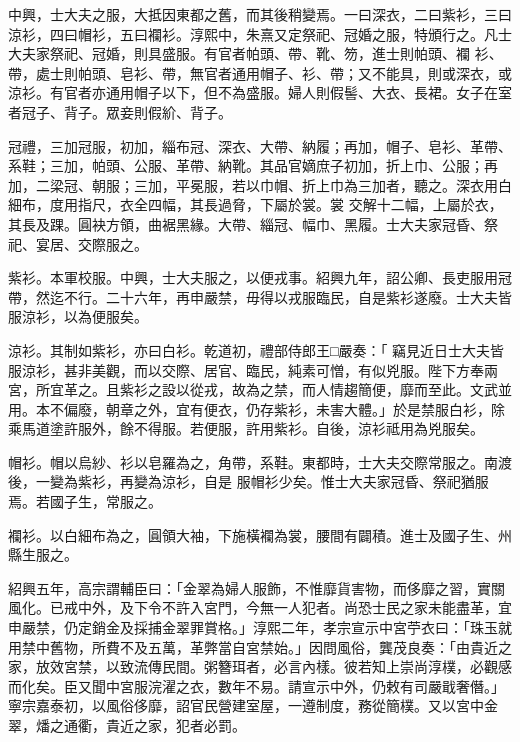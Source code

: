 \begin{pinyinscope}
 中興，士大夫之服，大抵因東都之舊，而其後稍變焉。一曰深衣，二曰紫衫，三曰涼衫，四曰帽衫，五曰襴衫。淳熙中，朱熹又定祭祀、冠婚之服，特頒行之。凡士大夫家祭祀、冠婚，則具盛服。有官者帕頭、帶、靴、笏，進士則帕頭、襴
 衫、帶，處士則帕頭、皂衫、帶，無官者通用帽子、衫、帶；又不能具，則或深衣，或涼衫。有官者亦通用帽子以下，但不為盛服。婦人則假髻、大衣、長裙。女子在室者冠子、背子。眾妾則假紒、背子。



 冠禮，三加冠服，初加，緇布冠、深衣、大帶、納履；再加，帽子、皂衫、革帶、系鞋；三加，帕頭、公服、革帶、納靴。其品官嫡庶子初加，折上巾、公服；再加，二梁冠、朝服；三加，平冕服，若以巾帽、折上巾為三加者，聽之。深衣用白細布，度用指尺，衣全四幅，其長過脅，下屬於裳。裳
 交解十二幅，上屬於衣，其長及踝。圓袂方領，曲裾黑緣。大帶、緇冠、幅巾、黑履。士大夫家冠昏、祭祀、宴居、交際服之。



 紫衫。本軍校服。中興，士大夫服之，以便戎事。紹興九年，詔公卿、長吏服用冠帶，然迄不行。二十六年，再申嚴禁，毋得以戎服臨民，自是紫衫遂廢。士大夫皆服涼衫，以為便服矣。



 涼衫。其制如紫衫，亦曰白衫。乾道初，禮部侍郎王□嚴奏：「
 竊見近日士大夫皆服涼衫，甚非美觀，而以交際、居官、臨民，純素可憎，有似兇服。陛下方奉兩宮，所宜革之。且紫衫之設以從戎，故為之禁，而人情趨簡便，靡而至此。文武並用。本不偏廢，朝章之外，宜有便衣，仍存紫衫，未害大體。」於是禁服白衫，除乘馬道塗許服外，餘不得服。若便服，許用紫衫。自後，涼衫祗用為兇服矣。



 帽衫。帽以烏紗、衫以皂羅為之，角帶，系鞋。東都時，士大夫交際常服之。南渡後，一變為紫衫，再變為涼衫，自是
 服帽衫少矣。惟士大夫家冠昏、祭祀猶服焉。若國子生，常服之。



 襴衫。以白細布為之，圓領大袖，下施橫襴為裳，腰間有闢積。進士及國子生、州縣生服之。



 紹興五年，高宗謂輔臣曰：「金翠為婦人服飾，不惟靡貨害物，而侈靡之習，實關風化。已戒中外，及下令不許入宮門，今無一人犯者。尚恐士民之家未能盡革，宜申嚴禁，仍定銷金及採捕金翠罪賞格。」淳熙二年，孝宗宣示中宮苧衣曰：「珠玉就
 用禁中舊物，所費不及五萬，革弊當自宮禁始。」因問風俗，龔茂良奏：「由貴近之家，放效宮禁，以致流傳民間。粥簪珥者，必言內樣。彼若知上崇尚淳樸，必觀感而化矣。臣又聞中宮服浣濯之衣，數年不易。請宣示中外，仍敕有司嚴戢奢僭。」寧宗嘉泰初，以風俗侈靡，詔官民營建室屋，一遵制度，務從簡樸。又以宮中金翠，燔之通衢，貴近之家，犯者必罰。



\end{pinyinscope}